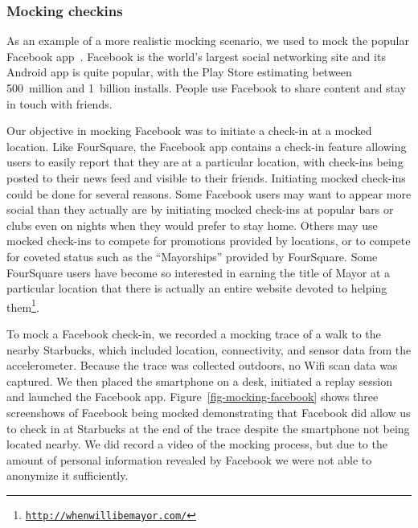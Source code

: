 \subsubsection{Mocking checkins}

As an example of a more realistic mocking scenario, we used \PocketMocker{}
to mock the popular Facebook app~\cite{facebook-playstore-url}. Facebook is
the world's largest social networking site and its Android app is quite
popular, with the Play Store estimating between 500~million and 1~billion
installs. People use Facebook to share content and stay in touch with
friends.

Our objective in mocking Facebook was to initiate a check-in at a mocked
location. Like FourSquare, the Facebook app contains a check-in feature
allowing users to easily report that they are at a particular location, with
check-ins being posted to their news feed and visible to their friends.
Initiating mocked check-ins could be done for several reasons. Some Facebook
users may want to appear more social than they actually are by initiating
mocked check-ins at popular bars or clubs even on nights when they would
prefer to stay home. Others may use mocked check-ins to compete for
promotions provided by locations, or to compete for coveted status such as
the ``Mayorships'' provided by FourSquare. Some FourSquare users have become
so interested in earning the title of Mayor at a particular location that
there is actually an entire website devoted to helping
them\footnote{\hyperlink{http://whenwillibemayor.com/}{\texttt{http://whenwillibemayor.com/}}}.

To mock a Facebook check-in, we recorded a mocking trace of a walk to the
nearby Starbucks, which included location, connectivity, and sensor data from
the accelerometer. Because the trace was collected outdoors, no Wifi scan
data was captured. We then placed the smartphone on a desk, initiated a
replay session and launched the Facebook app.
Figure~\ref{fig-mocking-facebook} shows three screenshows of Facebook being
mocked demonstrating that Facebook did allow us to check in at Starbucks at
the end of the trace despite the smartphone not being located nearby. We did
record a video of the mocking process, but due to the amount of personal
information revealed by Facebook we were not able to anonymize it
sufficiently.

